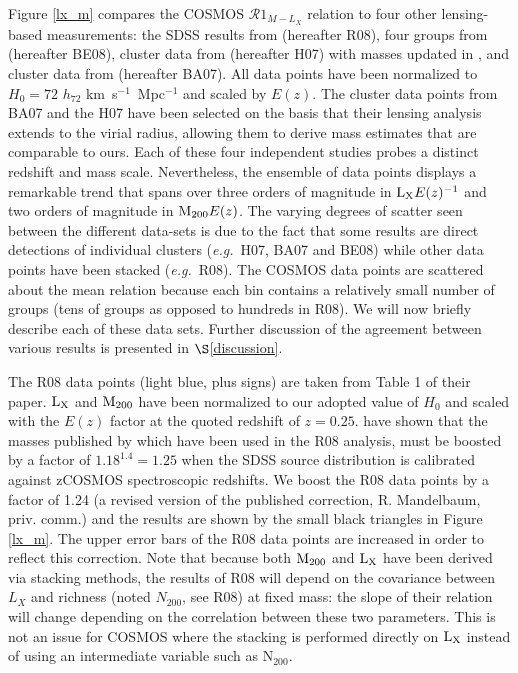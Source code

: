 \documentclass[12pt]{emulateapj}
\newcommand{\m}{$\rm{M}_{\rm 200}$ }
\newcommand{\lx}{$\rm{L}_{\rm X}$ }
\newcommand{\eg}{{\it e.g.}}
\begin{document}
Figure \ref{lx_m} compares the COSMOS $\mathcal{R}1_{M-L_{X}}$
relation to four other lensing-based measurements: the SDSS results
from \citet{Rykoff:2008} (hereafter R08), four groups from
\citet{Berge:2008} (hereafter BE08), cluster data from
\citet{Hoekstra:2007} (hereafter H07) with masses updated in
\citet{Mahdavi:2008}, and cluster data from \citet{Bardeau:2007}
(hereafter BA07). All data points have been normalized to $H_0=72$
$h_{72}$ km~s$^{-1}$~Mpc$^{-1}$ and scaled by $E(z)$. The cluster data
points from BA07 and the H07 have been selected on the basis that
their lensing analysis extends to the virial radius, allowing them to
derive mass estimates that are comparable to ours. Each of these four
independent studies probes a distinct redshift and mass
scale. Nevertheless, the ensemble of data points displays a remarkable
trend that spans over three orders of magnitude in ${\rm L}_{\rm X}
E(z)^{-1}$ and two orders of magnitude in ${\rm M}_{\rm 200}E(z)$. The
varying degrees of scatter seen between the different data-sets is due
to the fact that some results are direct detections of individual
clusters (\eg\ H07, BA07 and BE08) while other data points have been
stacked (\eg\ R08). The COSMOS data points are scattered about the
mean relation because each bin contains a relatively small number of
groups (tens of groups as opposed to hundreds in R08). We will now
briefly describe each of these data sets. Further discussion of the
agreement between various results is presented in
$\S$\ref{discussion}.

The R08 data points (light blue, plus signs) are taken from Table 1 of
their paper.  \lx and \m have been normalized to our adopted value of
$H_0$ and scaled with the $E(z)$ factor at the quoted redshift of
$z=0.25$. \citet{Mandelbaum:2008} have shown that the masses published
by \citet{Johnston:2007} which have been used in the R08 analysis,
must be boosted by a factor of $1.18^{1.4} = 1.25$ when the SDSS
source distribution is calibrated against zCOSMOS spectroscopic
redshifts. We boost the R08 data points by a factor of 1.24 (a revised
version of the published correction, R. Mandelbaum, priv. comm.) and
the results are shown by the small black triangles in Figure
\ref{lx_m}. The upper error bars of the R08 data points are increased
in order to reflect this correction. Note that because both \m and \lx
have been derived via stacking methods, the results of R08 will depend
on the covariance between $L_{X}$ and richness (noted $N_{200}$, see
R08) at fixed mass: the slope of their relation will change depending
on the correlation between these two parameters. This is not an issue
for COSMOS where the stacking is performed directly on \lx instead of
using an intermediate variable such as N$_{200}$.
\end{document}
